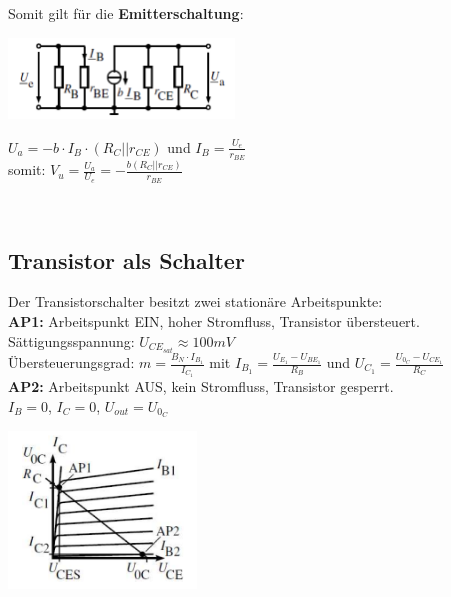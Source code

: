 		Somit gilt für die \textbf{Emitterschaltung}: \\
		\begin{minipage}[c]{6cm}
			\includegraphics[width=6cm]{images/emittersch-esb}
		\end{minipage}
		\begin{minipage}[c]{12cm}
			$U_a = -b \cdot I_B \cdot (R_C || r_{CE})$ und $I_B=\frac{U_e}{r_{BE}}$ \\
			somit: $V_u = \frac{U_a}{U_e} = -\frac{b(R_C || r_{CE})}{r_{BE}}$ 
		\end{minipage} \\
		
	\subsection{Transistor als Schalter}
		\begin{minipage}[c]{12cm}
			Der Transistorschalter besitzt zwei stationäre Arbeitspunkte: \\
			
			\textbf{AP1:} Arbeitspunkt EIN, hoher Stromfluss, Transistor übersteuert. \\
			Sättigungsspannung: $U_{CE_{sat}} \approx 100mV$ \\
			Übersteuerungsgrad: $m = \frac{B_N \cdot I_{B_1}}{I_{C_1}}$ mit
			$I_{B_1}=\frac{U_{E_1}-U_{BE_1}}{R_B}$ und $U_{C_1}=\frac{U_{0_C}-U_{CE_1}}{R_C}$ \\
			
			\textbf{AP2:} Arbeitspunkt AUS, kein Stromfluss, Transistor gesperrt. \\
			$I_B = 0$, $I_C = 0$, $U_{out} = U_{0_C}$
		\end{minipage}
		\begin{minipage}[c]{5cm}
			\includegraphics[width=5cm]{images/bip-schalter-ap}
		\end{minipage} \\
		
